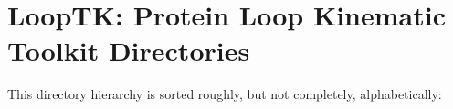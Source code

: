 \section{Loop\-TK: Protein Loop Kinematic Toolkit Directories}
This directory hierarchy is sorted roughly, but not completely, alphabetically:\begin{CompactList}
\item {}
\begin{CompactList}
\item {}
\end{CompactList}
\end{CompactList}
